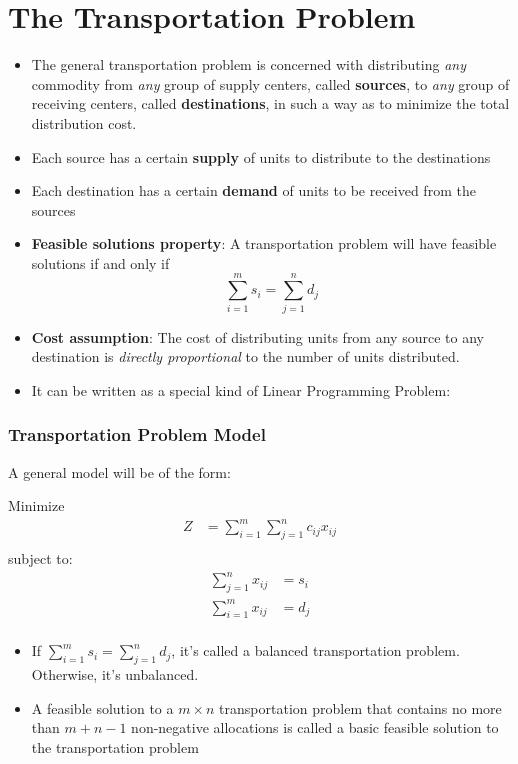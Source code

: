 \documentclass[12pt]{article}
\begin{document}
\section{The Transportation Problem}

\begin{itemize}
\item The general transportation problem is concerned with distributing \emph{any} commodity from \emph{any} group of supply centers, called \textbf{sources}, to \emph{any} group of receiving centers, called \textbf{destinations}, in such a way as to minimize the total distribution cost.
\item Each source has a certain \textbf{supply} of units to distribute to the destinations
\item Each destination has a certain \textbf{demand} of units to be received from the sources
\item \textbf{Feasible solutions property}: A transportation problem will have feasible solutions if and only if  $$ \sum_{i=1}^m s_i = \sum_{j=1}^n d_j $$
\item \textbf{Cost assumption}: The cost of distributing units from any source to any destination is \emph{directly proportional} to the number of units distributed.
\item It can be written as a special kind of Linear Programming Problem:
\end{itemize}

\subsubsection*{Transportation Problem Model}
A general model will be of the form:

Minimize
\begin{align*}
Z &= \sum_{i=1}^{m} \sum_{j=1}^{n} c_{ij} x_{ij}  \\
\end{align*}
subject to:
\begin{align*}
\sum_{j=1}^{n} x_{ij}&= s_i \tag{for i=1,2,3\ldots m}  \\
\sum_{i=1}^{m} x_{ij}&= d_j \tag{for j=1,2,3\ldots n}  \\
\end{align*}
\begin{itemize}
\item If $\sum_{i=1}^{m} s_i =  \sum_{j=1}^{n} d_j$, it's called a balanced transportation problem. Otherwise, it's unbalanced.
\item A feasible solution to a $m\times n$ transportation problem that contains no more than $m+n-1$ non-negative allocations is called a basic feasible solution to the transportation problem
\end{itemize}
\end{document}
